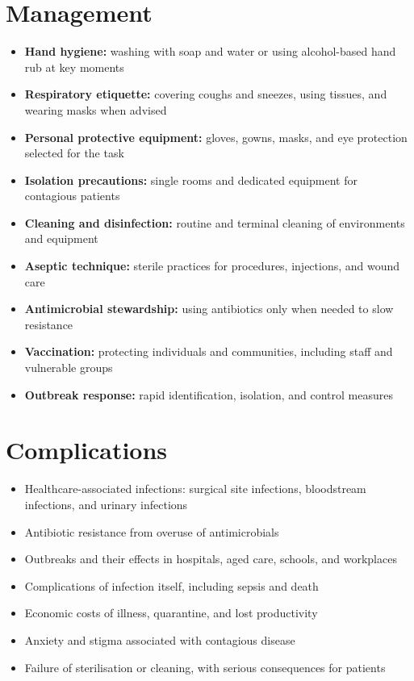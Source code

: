 \section*{Management}
\begin{itemize}
    \item \textbf{Hand hygiene:} washing with soap and water or using alcohol-based hand rub at key moments
    \item \textbf{Respiratory etiquette:} covering coughs and sneezes, using tissues, and wearing masks when advised
    \item \textbf{Personal protective equipment:} gloves, gowns, masks, and eye protection selected for the task
    \item \textbf{Isolation precautions:} single rooms and dedicated equipment for contagious patients
    \item \textbf{Cleaning and disinfection:} routine and terminal cleaning of environments and equipment
    \item \textbf{Aseptic technique:} sterile practices for procedures, injections, and wound care
    \item \textbf{Antimicrobial stewardship:} using antibiotics only when needed to slow resistance
    \item \textbf{Vaccination:} protecting individuals and communities, including staff and vulnerable groups
    \item \textbf{Outbreak response:} rapid identification, isolation, and control measures
\end{itemize}

\section*{Complications}
\begin{itemize}
    \item Healthcare-associated infections: surgical site infections, bloodstream infections, and urinary infections
    \item Antibiotic resistance from overuse of antimicrobials
    \item Outbreaks and their effects in hospitals, aged care, schools, and workplaces
    \item Complications of infection itself, including sepsis and death
    \item Economic costs of illness, quarantine, and lost productivity
    \item Anxiety and stigma associated with contagious disease
    \item Failure of sterilisation or cleaning, with serious consequences for patients
\end{itemize}

